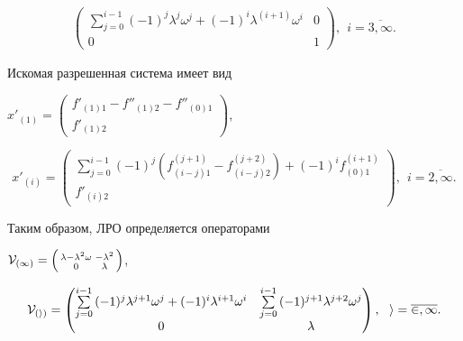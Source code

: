\begin{exam}
\begin{gather*}
\begin{pmatrix}


\sum\limits_{j=0}^{i-1}{(-1)^j \lambda^j \omega^j}


+(-1)^i\lambda^{(i+1)} \omega^i  & 0\\  0 & 1 


\end{pmatrix},\ \ i=\overline{3,\infty}.


\end{gather*}


Искомая разрешенная система имеет вид


$x'_{(1)}= \left(\begin{smallmatrix}


 f'_{(1)1}- f''_{(1)2}-f''_{(0)1}\\ f'_{(1)2}


\end{smallmatrix} \right)$,


$$


x'_{(i)}= 


\begin{pmatrix}


\sum\limits_{j=0}^{i-1}{(-1)^j \left( f_{(i-j)1}^{(j+1)}-f_{(i-j)2}^{(j+2)}


\right) } +(-1)^i f^{(i+1)}_{(0)1}\\  f'_{(i)2}


\end{pmatrix},\ \ i=\overline{2,\infty }.


$$





Таким образом, ЛРО определяется операторами


$\cal V_{(1)}= \left(\begin{smallmatrix}


 \lambda-\lambda^2 \omega & -\lambda^2 \\ 0 & \lambda 


\end{smallmatrix}\right)$,


$$


\cal V_{(i)}=


\begin{pmatrix}


 \sum\limits_{j=0}^{i-1}{(-1)^j \lambda^{j+1} \omega^j} +


 (-1)^i\lambda^{i+1} \omega^i &


 \sum\limits_{j=0}^{i-1}{(-1)^{j+1} \lambda^{j+2} \omega^j} \\


 0 & \lambda


\end{pmatrix},\ \ i=\overline{2,\infty }.


$$


\end{exam}






